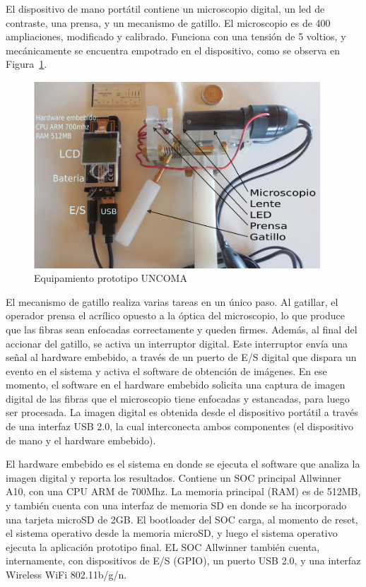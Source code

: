 \documentclass[runningheads,a4paper]{llncs}
\begin{document}
El dispositivo de mano portátil contiene un microscopio digital, un led de contraste, una prensa, y un mecanismo de gatillo.
El microscopio es de 400 ampliaciones, modificado y calibrado. Funciona con una tensión de 5 voltios, y mecánicamente se encuentra empotrado en el dispositivo, como se observa en Figura~\ref{fig:prototipo4}.
\begin{figure}
\centering
\includegraphics[height=7cm]{prototipo4}
\caption{Equipamiento prototipo UNCOMA}
\label{fig:prototipo4}
\end{figure}

El mecanismo de gatillo realiza varias tareas en un único paso. Al gatillar, el operador prensa el acrílico opuesto a la óptica del microscopio, lo que produce que las fibras sean enfocadas correctamente y queden firmes. Además, al final del accionar del gatillo, se activa un interruptor digital. Este interruptor envía una señal al hardware embebido, a través de un puerto de E/S digital que dispara un evento en el sistema y activa el software de obtención de imágenes.
En ese momento, el software en el hardware embebido solicita una captura de imagen digital de las fibras que el microscopio tiene enfocadas y estancadas, para luego ser procesada. La imagen digital es obtenida desde el dispositivo portátil a través de una interfaz USB 2.0, la cual interconecta ambos componentes (el dispositivo de mano y el hardware embebido).

El hardware embebido es el sistema en donde se ejecuta el software
que analiza la imagen digital y reporta los resultados. Contiene un SOC principal Allwinner A10, con una CPU ARM de 700Mhz. La memoria principal (RAM) es de 512MB, y también cuenta con una interfaz de memoria SD en donde se ha incorporado una tarjeta microSD de 2GB. El bootloader del SOC carga, al momento de reset, el sistema
operativo desde la memoria microSD, y luego el sistema operativo ejecuta
la aplicación prototipo final.
EL SOC Allwinner también cuenta, internamente, con dispositivos de E/S (GPIO), un puerto USB 2.0, y una interfaz Wireless WiFi 802.11b/g/n.
\end{document}
